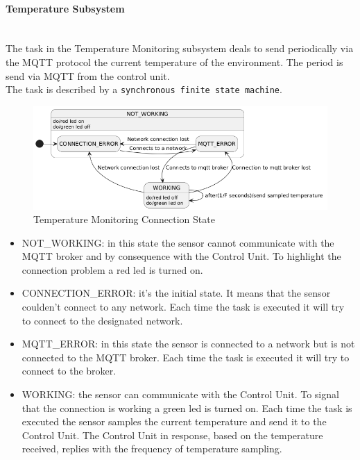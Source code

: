 \documentclass[a4paper,12pt]{report}
\begin{document}
            \paragraph{Temperature Subsystem\\}
                \ \\
                The task in the Temperature Monitoring subsystem deals to send periodically via the MQTT protocol the current temperature of 
                the environment. The period is send via MQTT from the control unit.\\
                The task is described by a \texttt{synchronous finite state machine}. 
    
                \begin{figure}[H]
                    \centering{}
                    \includegraphics[width=\textwidth]{uml/img/TemperatureCommunicationUML.png}
                    \caption{Temperature Monitoring Connection State}
                    \label{img:connection_state}
                \end{figure}
    
                \begin{itemize}
                    \item NOT\_WORKING: in this state the sensor cannot communicate with the MQTT broker and by consequence with the Control 
                    Unit. To highlight the connection problem a red led is turned on.
                    \item CONNECTION\_ERROR: it's the initial state. It means that the sensor coulden't connect to any network. Each time the 
                    task is executed it will try to connect to the designated network.
                    \item MQTT\_ERROR: in this state the sensor is connected to a network but is not connected to the MQTT broker. Each time 
                    the task is executed it will try to connect to the broker.
                    \item WORKING: the sensor can communicate with the Control Unit. To signal that the connection is working a green led is 
                    turned on. Each time the task is executed the sensor samples the current temperature and send it to the Control Unit. 
                    The Control Unit in response, based on the temperature received, replies with the frequency of temperature sampling.
                \end{itemize}
    
\end{document}
